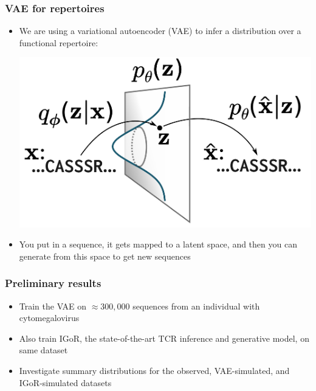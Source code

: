\documentclass[mathserif,compress]{beamer}
\renewcommand\;{\,}
\begin{document}
\begin{frame}\frametitle{VAE for repertoires}
\begin{itemize}
\item
We are using a variational autoencoder (VAE) to infer a distribution over a functional repertoire:
\begin{center}
\includegraphics[width=0.7\linewidth]{Images/VAE.png}
\end{center}
\bigskip
\item
You put in a sequence, it gets mapped to a latent space, and then you can generate from this space to get new sequences
\end{itemize}
\end{frame}

\begin{frame}\frametitle{Preliminary results}
\begin{itemize}
\item
Train the VAE on $\approx300,000$ sequences from an individual with cytomegalovirus
\bigskip
\item
Also train IGoR, the state-of-the-art TCR inference and generative model, on same dataset
\bigskip
\item
Investigate summary distributions for the observed, VAE-simulated, and IGoR-simulated datasets 
\end{itemize}
\end{frame}
\end{document}
